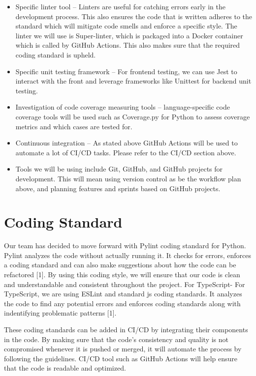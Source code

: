 \documentclass{article}
\begin{document}
\begin{itemize}
  \item Specific linter tool -- Linters are useful for catching errors early in the development process. This also ensures the code that is written adheres to the standard which will mitigate code smells and enforce a specific style. The linter we will use is Super-linter, which is packaged into a Docker container which is called by GitHub Actions. This also makes sure that the required coding standard is upheld.
  \item Specific unit testing framework -- For frontend testing, we can use Jest to interact with the front and leverage frameworks like Unittest for backend unit testing.
  \item Investigation of code coverage measuring tools -- language-specific code coverage tools will be used such as Coverage.py for Python to assess coverage metrics and which cases are tested for.
  \item Continuous integration -- As stated above GitHub Actions will be used to automate a lot of CI/CD tasks. Please refer to the CI/CD section above.

  \item Tools we will be using include Git, GitHub, and GitHub projects for development. This will mean using version control as be the workflow plan above, and planning features and sprints based on GitHub projects. 
\end{itemize}

\section{Coding Standard}

Our team has decided to move forward with Pylint coding standard for Python. Pylint analyzes the code without actually running it. It checks for errors, enforces a coding standard and can also make suggestions about how the code can be refactored [1]. By using this coding style, we will ensure that our code is clean and understandable and consistent throughout the project.
For TypeScript- For TypeScript, we are using ESLint and standard js coding standards. It analyzes the code to find any potential errors and enforces coding standards along with indentifying problematic patterns [1].

These coding standards can be added in CI/CD by integrating their components in the code. By making sure that the code's consistency and quality is not compromised whenever it is pushed or merged, it will automate the process by following the guidelines.
CI/CD tool such as GitHub Actions will help ensure that the code is readable and optimized. 
\end{document}
